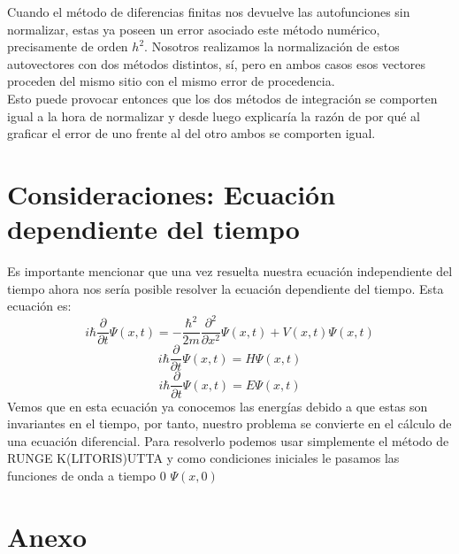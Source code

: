 \documentclass[12pt]{article}
\begin{document}
Cuando el método de diferencias finitas nos devuelve las autofunciones sin normalizar, estas ya poseen un error asociado  este método numérico, precisamente de orden $h^2$. Nosotros realizamos la normalización de estos autovectores con dos métodos distintos, sí, pero en ambos casos esos vectores proceden del mismo sitio con el mismo error de procedencia.\\

Esto puede provocar entonces que los dos métodos de integración se comporten igual a la hora de normalizar y desde luego explicaría la razón de por qué al graficar el error de uno frente al del otro ambos se comporten igual.
    
\section{Consideraciones: Ecuación dependiente del tiempo}

Es importante mencionar que una vez resuelta nuestra ecuación independiente del tiempo ahora nos sería posible resolver la ecuación dependiente del tiempo. Esta ecuación es:
\begin{equation}
    i\hbar \frac{\partial}{\partial t} \Psi(x, t) = -\frac{\hbar^2}{2m} \frac{\partial^2}{\partial x^2} \Psi(x, t) + V(x, t) \Psi(x, t)
\end{equation}
\begin{equation}
    i\hbar \frac{\partial}{\partial t} \Psi(x, t) = H \Psi(x, t)
\end{equation}
\begin{equation}
    i\hbar \frac{\partial}{\partial t} \Psi(x, t) = E \Psi(x, t)
\end{equation}
Vemos que en esta ecuación ya conocemos las energías debido a que estas son invariantes en el tiempo, por tanto, nuestro problema se convierte en el cálculo de una ecuación diferencial.
Para resolverlo podemos usar simplemente el método de
RUNGE K(LITORIS)UTTA y como condiciones iniciales le pasamos las funciones de onda a tiempo 0 $\Psi(x,0)$




















\newpage
\section{Anexo}
\end{document}
